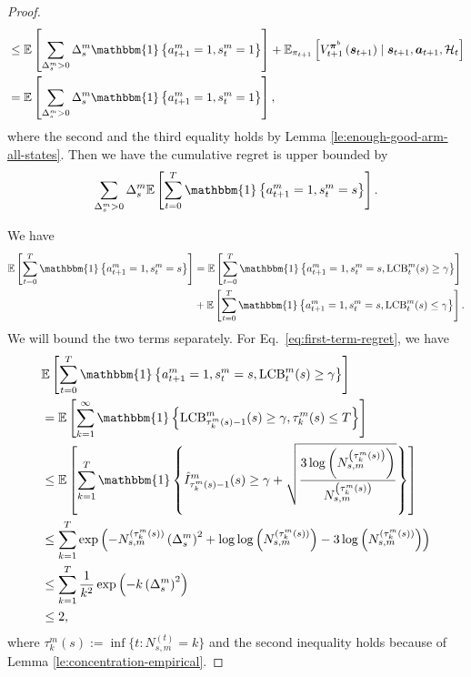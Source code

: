 \begin{proof}
\begin{align*}
         &\leq \E\left[\sum_{\Delta_s^m>0}\Delta_s^m\mathbbm{1}\left\{a_{t+1}^m=1,s_t^m=1\right\}\right]+\E_{\pi_{t+1}}\left[V_{t+1}^{\bm{\pi}^b}\left(\bm{s}_{t+1}\right)\mid \bm{s}_{t+1},\bm{a}_{t+1},\mathcal{H}_t\right]\\
         &=\E\left[\sum_{\Delta_s^m>0}\Delta_s^m\mathbbm{1}\left\{a_{t+1}^m=1,s_t^m=1\right\}\right],
    \end{align*}
    where the second and the third equality holds by Lemma \ref{le:enough-good-arm-all-states}. Then we have the cumulative regret is upper bounded by
    \begin{equation*}
        \sum_{\Delta_s^m>0}\Delta_s^m\E\left[\sum_{t=0}^T \mathbbm{1}\left\{a_{t+1}^m=1,s_t^m=s\right\}\right].
    \end{equation*}

    We have
\begin{align}
    \E\left[\sum_{t=0}^T \mathbbm{1}\left\{a_{t+1}^m=1,s_t^m=s\right\}\right]&=\E\left[\sum_{t=0}^T \mathbbm{1}\left\{a_{t+1}^m=1,s_t^m=s,\mathrm{LCB}_{t}^m(s)\geq\gamma\right\}\right]\label{eq:first-term-regret}\\&+\E\left[\sum_{t=0}^T \mathbbm{1}\left\{a_{t+1}^m=1,s_t^m=s,\mathrm{LCB}_{t}^m(s)\leq\gamma\right\}\right]\label{eq:second-term-regret}.
\end{align}
We will bound the two terms separately. For Eq.~\eqref{eq:first-term-regret}, we have
\begin{align}
    &\E\left[\sum_{t=0}^T \mathbbm{1}\left\{a_{t+1}^m=1,s_t^m=s,\mathrm{LCB}_{t}^m(s)\geq\gamma\right\}\right]\notag\\&=\E\left[\sum_{k=1}^\infty \mathbbm{1}\left\{\mathrm{LCB}_{\tau_k^m(s)-1}^m(s)\geq\gamma,\tau_k^m(s)\leq T\right\}\right]\notag\\
    &\leq \E\left[\sum_{k=1}^T \mathbbm{1}\left\{\hat{I}_{\tau_k^m(s)-1}^m(s)\geq\gamma+\sqrt{\frac{3\log\left(N_{s,m}^{\left(\tau_k^m(s)\right)}\right)}{N_{s,m}^{\left(\tau_k^m(s)\right)}}}\right\}\right]\notag\\
    &\leq\sum_{k=1}^T \exp\left(-N_{s,m}^{\left(\tau_k^m(s)\right)}\left(\Delta_s^m\right)^2+\log\log\left(N_{s,m}^{\left(\tau_k^m(s)\right)}\right)-3\log\left(N_{s,m}^{\left(\tau_k^m(s)\right)}\right)\right)\notag\\
    &\leq \sum_{k=1}^T \frac{1}{k^2}\exp\left(-k\left(\Delta_s^m\right)^2\right)\notag\\
    &\leq 2,\label{eq:regret-theorem-first-term}
\end{align}
where $\tau_k^m(s):=\inf\{t:N_{s,m}^{(t)}=k\}$ and the second inequality holds because of Lemma \ref{le:concentration-empirical}. 


\end{proof}
